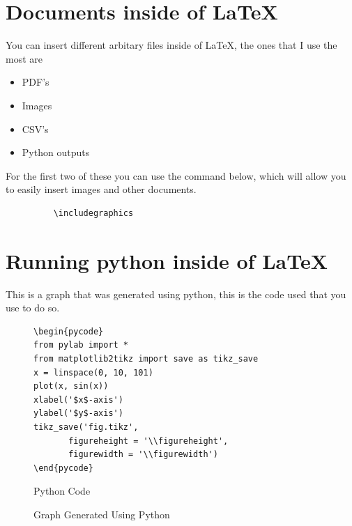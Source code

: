\documentclass[12pt, letterpaper, oneside]{article} \usepackage[utf8]{inputenc}
\newlength\figureheight
\newlength\figurewidth
\begin{document}
\pagebreak

\section{Documents inside of \LaTeX{}}

You can insert different arbitary files inside of \LaTeX{}, the ones that I use the most are 

\begin{itemize}
	\item PDF's
	\item Images
	\item CSV's
	\item Python outputs
\end{itemize}

For the first two of these you can use the command below, which will allow you to easily insert images and other documents.
\begin{figure}[H]
	\begin{lstlisting}
	\includegraphics
	\end{lstlisting}
\end{figure}


\section{Running python inside of \LaTeX{}}

This is a graph that was generated using python, this is the code used that you use to do so.

\begin{center}
\begin{figure}[H]
	\centering
	\begin{lstlisting}
\begin{pycode}
from pylab import *
from matplotlib2tikz import save as tikz_save
x = linspace(0, 10, 101)
plot(x, sin(x))
xlabel('$x$-axis')
ylabel('$y$-axis')
tikz_save('fig.tikz',
       figureheight = '\\figureheight',
       figurewidth = '\\figurewidth')
\end{pycode}
	\end{lstlisting}
	\caption{Python Code}
\end{figure}
\end{center}


\begin{figure}[H]
	\centering
\setlength\figureheight{3.5in}
\setlength\figurewidth{\linewidth}
	\caption{Graph Generated Using Python}
\end{figure}
\end{document}
